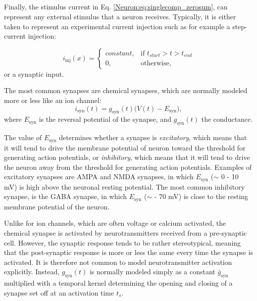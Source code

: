 \subsection{}
\label{sec:Neuron:stim}
Finally, the stimulus current in Eq. \ref{Neuron:eq:singlecomp_zerosum}, can represent any external stimulus that a neuron receives. Typically, it is either taken to represent an experimental current injection such as for example a step-current injection:

\begin{equation}
i_\text{inj}(x)= 
\begin{cases}
    constant, & \text{if } t_{start} > t > t_{end} \\
    0,              & \text{otherwise},
\end{cases}
\label{Neuron:eq:injected}
\end{equation}
or a synaptic input. 

The most common synapses are chemical synapses, which are normally modeled more or less like an ion channel:
\begin{equation}
i_\text{syn}(t) = g_\text{syn}(t) \big(V(t)-E_\text{syn} \big), 
\label{Neuron:eq:chemicalsynapse}
\end{equation}
where $E_\text{syn}$ is the reversal potential of the synapse, and $g_\text{syn}(t)$ the conductance. 

The value of $E_\text{syn}$ determines whether a synapse is \textit{excitatory}, which means that it will tend to drive the  membrane potential of neuron toward the threshold for generating action potentials, or \textit{inhibitory}, which means that it will tend to drive the neuron away from the threshold for generating action potentials. Examples of excitatory synapses are AMPA and NMDA synapses, in which $E_\text{syn}$ ($\sim$ 0 - 10 mV) is high above the neuronal resting potential. The most common inhibitory synapse, is the GABA synapse, in which $E_\text{syn}$ ($\sim$ - 70 mV) is close to the resting membrane potential of the neuron.

Unlike for ion channels, which are often voltage or calcium activated, the chemical synapse is activated by neurotransmitters received from a pre-synaptic cell. However, the synaptic response tends to be rather stereotypical, meaning that the post-synaptic response is more or less the same every time the synapse is activated. It is therefore not common to model neurotransmitter activation explicitly. Instead, $g_\text{syn}(t)$ is normally modeled simply as a constant $\bar{g}_\text{syn}$ multiplied with a temporal kernel determining the opening and closing of a synapse set off at an activation time $t_s$. 

